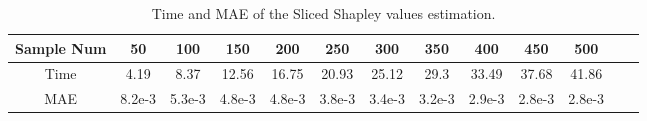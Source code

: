\begin{center}
\begin{small}
\begin{table*}[ht]
\caption{Time and MAE of the Sliced Shapley values estimation.}\label{table:qasper_mse}
\centering
\begin{tabular}{|*{13}{c|}} %
\bottomrule
Sample Num &  50 &  100 &  150 &  200 &  250 &  300 &  350 &  400 &  450 &  500 \\
\bottomrule
    Time 
&  4.19
&  8.37
&  12.56
&  16.75
&  20.93
&  25.12
&  29.3
&  33.49
&  37.68
&  41.86
 \\
MAE 
&  8.2e-3
&  5.3e-3
&  4.8e-3
&  4.8e-3
&  3.8e-3
&  3.4e-3
&  3.2e-3
&  2.9e-3
&  2.8e-3
&  2.8e-3\\
\bottomrule
\end{tabular}
\end{table*}
\end{small}
\end{center}